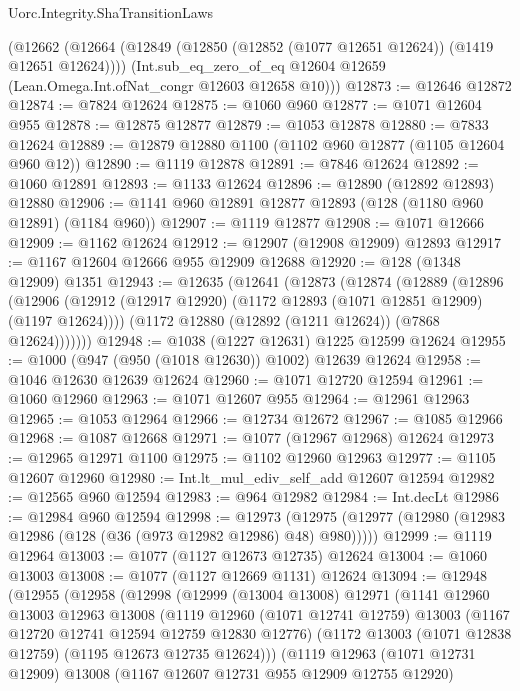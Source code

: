 \begin{lexlean}{Uorc.Integrity.ShaTransitionLaws}
\begin{coremodule}
    (@12662
      (@12664 (@12849 (@12850 (@12852 (@1077 @12651 @12624)) (@1419 @12651 @12624))))
      (Int.sub_eq_zero_of_eq @12604 @12659 (Lean.Omega.Int.ofNat_congr @12603 @12658 @10)))
@12873 := @12646 @12872
@12874 := @7824 @12624
@12875 := @1060 @960
@12877 := @1071 @12604 @955
@12878 := @12875 @12877
@12879 := @1053 @12878
@12880 := @7833 @12624
@12889 := @12879 @12880 @1100 (@1102 @960 @12877 (@1105 @12604 @960 @12))
@12890 := @1119 @12878
@12891 := @7846 @12624
@12892 := @1060 @12891
@12893 := @1133 @12624
@12896 := @12890 (@12892 @12893) @12880
@12906 := @1141 @960 @12891 @12877 @12893 (@128 (@1180 @960 @12891) (@1184 @960))
@12907 := @1119 @12877
@12908 := @1071 @12666
@12909 := @1162 @12624
@12912 := @12907 (@12908 @12909) @12893
@12917 := @1167 @12604 @12666 @955 @12909 @12688
@12920 := @128 (@1348 @12909) @1351
@12943 := @12635
    (@12641
      (@12873
        (@12874
          (@12889
            (@12896
              (@12906 (@12912 (@12917 @12920) (@1172 @12893 (@1071 @12851 @12909) (@1197 @12624))))
              (@1172 @12880 (@12892 (@1211 @12624)) (@7868 @12624)))))))
@12948 := @1038 (@1227 @12631) @1225 @12599 @12624
@12955 := @1000 (@947 (@950 (@1018 @12630)) @1002) @12639 @12624
@12958 := @1046 @12630 @12639 @12624
@12960 := @1071 @12720 @12594
@12961 := @1060 @12960
@12963 := @1071 @12607 @955
@12964 := @12961 @12963
@12965 := @1053 @12964
@12966 := @12734 @12672
@12967 := @1085 @12966
@12968 := @1087 @12668
@12971 := @1077 (@12967 @12968) @12624
@12973 := @12965 @12971 @1100
@12975 := @1102 @12960 @12963
@12977 := @1105 @12607 @12960
@12980 := Int.lt_mul_ediv_self_add @12607 @12594
@12982 := @12565 @960 @12594
@12983 := @964 @12982
@12984 := Int.decLt
@12986 := @12984 @960 @12594
@12998 := @12973
    (@12975 (@12977 (@12980 (@12983 @12986 (@128 (@36 (@973 @12982 @12986) @48) @980)))))
@12999 := @1119 @12964
@13003 := @1077 (@1127 @12673 @12735) @12624
@13004 := @1060 @13003
@13008 := @1077 (@1127 @12669 @1131) @12624
@13094 := @12948
    (@12955
      (@12958
        (@12998
          (@12999
            (@13004 @13008)
            @12971
            (@1141
              @12960
              @13003
              @12963
              @13008
              (@1119
                @12960
                (@1071 @12741 @12759)
                @13003
                (@1167 @12720 @12741 @12594 @12759 @12830 @12776)
                (@1172 @13003 (@1071 @12838 @12759) (@1195 @12673 @12735 @12624)))
              (@1119
                @12963
                (@1071 @12731 @12909)
                @13008
                (@1167 @12607 @12731 @955 @12909 @12755 @12920)

\end{coremodule}
\end{lexlean}
